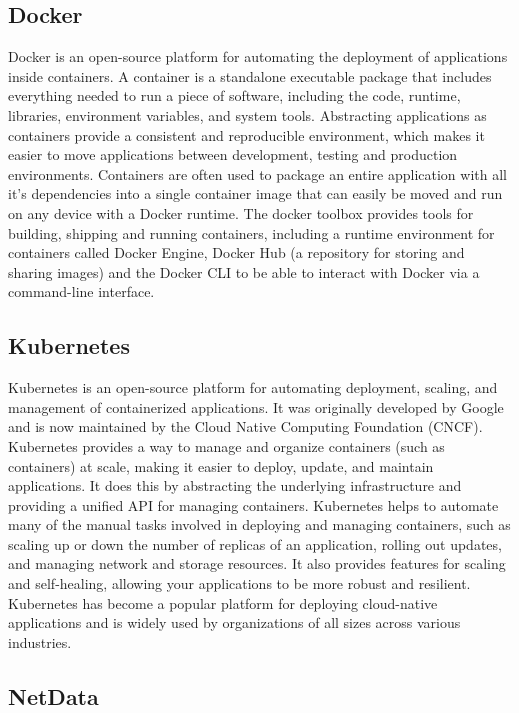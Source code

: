   \subsection{Docker}
  \label{sec:docker-evaluation-setup}

    Docker is an open-source platform for automating the deployment of applications inside containers. A container is a standalone executable package that includes everything needed to run a piece of software, including the code, runtime, libraries, environment variables, and system tools.
    Abstracting applications as containers provide a consistent and reproducible environment, which makes it easier to move applications between development, testing and production environments.
    Containers are often used to package an entire application with all it's dependencies into a single container image that can easily be moved and run on any device with a Docker runtime.
    The docker toolbox provides tools for building, shipping and running containers, including a runtime environment for containers called Docker Engine, Docker Hub (a repository for storing and sharing images) and the Docker CLI to be able to interact with Docker via a command-line interface.

  \subsection{Kubernetes}
  \label{sec:kubernetes-evaluation-setup}
    Kubernetes is an open-source platform for automating deployment, scaling, and management of containerized applications. It was originally developed by Google and is now maintained by the Cloud Native Computing Foundation (CNCF).
    Kubernetes provides a way to manage and organize containers (such as  containers) at scale, making it easier to deploy, update, and maintain applications. It does this by abstracting the underlying infrastructure and providing a unified API for managing containers.
    Kubernetes helps to automate many of the manual tasks involved in deploying and managing containers, such as scaling up or down the number of replicas of an application, rolling out updates, and managing network and storage resources. It also provides features for scaling and self-healing, allowing your applications to be more robust and resilient.
    Kubernetes has become a popular platform for deploying cloud-native applications and is widely used by organizations of all sizes across various industries.

  \subsection{NetData}
  \label{sec:netdata-evaluation-setup}

